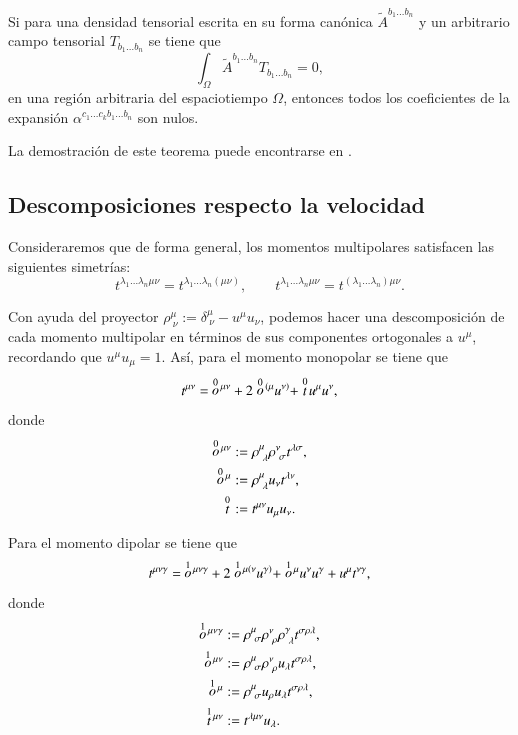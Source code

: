 \begin{theorem}
\label{teo:2}
Si para una densidad tensorial escrita en su forma canónica $\tilde{A}^{b_1 \dots b_n}$ y un arbitrario campo tensorial $T_{b_1 \dots b_n}$ se tiene que
\begin{equation}
\int_{\Omega}  \tilde{A}^{b_1 \dots b_n}T_{b_1 \dots b_n} = 0,
\end{equation}
en una región arbitraria del espaciotiempo $\Omega$, entonces todos los coeficientes de la expansión $\alpha^{c_1 \dots c_k b_1 \dots b_n}$ son nulos.
\end{theorem}

La demostración de este teorema puede encontrarse en \cite{Tulczyjew}.

\subsection{Descomposiciones respecto la velocidad}

Consideraremos que de forma general, los momentos multipolares satisfacen las siguientes simetrías:
\begin{equation}
t^{\lambda_1 \dots \lambda_n \mu \nu} = t^{\lambda_1 \dots \lambda_n (\mu \nu)}, \qquad t^{\lambda_1 \dots \lambda_n \mu \nu} = t^{(\lambda_1 \dots \lambda_n) \mu \nu}.
\end{equation}

Con ayuda del proyector $\rho^{\mu}_{\ \nu} := \delta^{\mu}_{\ \nu} - u^{\mu}u_{\nu}$, podemos hacer una descomposición de cada momento multipolar en términos de sus componentes ortogonales a $u^{\mu}$, recordando que $u^{\mu}u_{\mu} = 1$. Así, para el momento monopolar se tiene que
\begin{equation}
\label{eq:23}
t^{\mu \nu} = \ \stackrel{0}{o}{\!}^{\mu \nu} + 2 \stackrel{0}{o}{\!}^{(\mu} u^{\nu )} + \stackrel{0}{t}{\!} u^{\mu} u^{\nu},
\end{equation}
donde
\begin{align*}
\des{0}{o}^{\mu \nu} &:=  \rho^{\mu}_{\ \lambda} \rho^{\nu}_{\ \sigma} t^{\lambda \sigma},\\
\des{0}{o}^{\mu} &:= \rho^{\mu}_{\ \lambda} u_{\nu} t^{\lambda \nu},\\
\des{0}{t} &:= t^{\mu \nu} u_{\mu} u_{\nu}.
\end{align*}

Para el momento dipolar se tiene que
\begin{equation}
\label{eq:24}
t^{\mu \nu \gamma} = \ \stackrel{1}{o}{\!}^{\mu \nu \gamma} + 2 \stackrel{1}{o}{\!}^{\mu ( \nu} u^{\gamma )} + \stackrel{1}{o}{\!}^{\mu} u^{\nu} u^{\gamma} + u^{\mu} t^{\nu \gamma},
\end{equation}
donde
\begin{align*}
\des{1}{o}^{\mu \nu \gamma} &:= \rho^{\mu}_{\ \sigma} \rho^{\nu}_{\ \rho} \rho^{\gamma}_{\ \lambda} t^{\sigma \rho \lambda},\\
\des{1}{o}^{\mu \nu} &:= \rho^{\mu}_{\ \sigma} \rho^{\nu}_{\ \rho} u_{\lambda} t^{\sigma \rho \lambda},\\
\des{1}{o}^{\mu} &:= \rho^{\mu}_{\ \sigma} u_{\rho} u_{\lambda} t^{\sigma \rho \lambda},\\
\des{1}{t}^{\mu \nu} &:= t^{\lambda \mu \nu} u_{\lambda}.
\end{align*}

